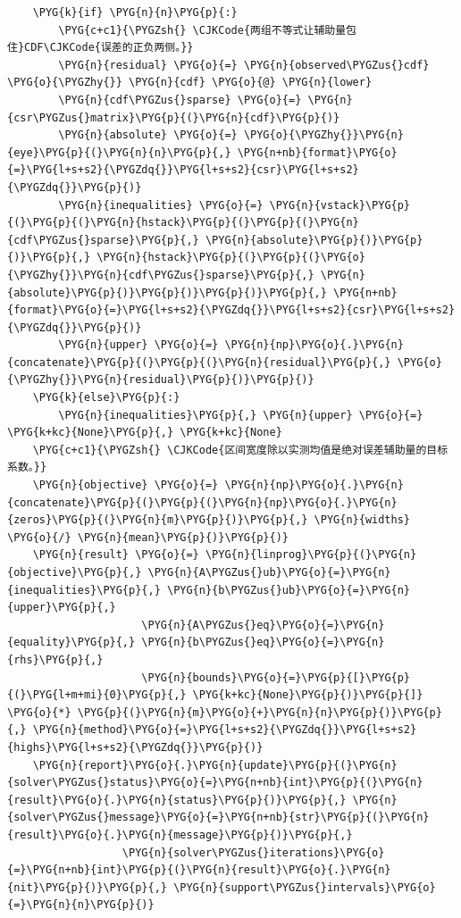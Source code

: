 \begin{Verbatim}
    \PYG{k}{if} \PYG{n}{n}\PYG{p}{:}
        \PYG{c+c1}{\PYGZsh{} \CJKCode{两组不等式让辅助量包住}CDF\CJKCode{误差的正负两侧。}}
        \PYG{n}{residual} \PYG{o}{=} \PYG{n}{observed\PYGZus{}cdf} \PYG{o}{\PYGZhy{}} \PYG{n}{cdf} \PYG{o}{@} \PYG{n}{lower}
        \PYG{n}{cdf\PYGZus{}sparse} \PYG{o}{=} \PYG{n}{csr\PYGZus{}matrix}\PYG{p}{(}\PYG{n}{cdf}\PYG{p}{)}
        \PYG{n}{absolute} \PYG{o}{=} \PYG{o}{\PYGZhy{}}\PYG{n}{eye}\PYG{p}{(}\PYG{n}{n}\PYG{p}{,} \PYG{n+nb}{format}\PYG{o}{=}\PYG{l+s+s2}{\PYGZdq{}}\PYG{l+s+s2}{csr}\PYG{l+s+s2}{\PYGZdq{}}\PYG{p}{)}
        \PYG{n}{inequalities} \PYG{o}{=} \PYG{n}{vstack}\PYG{p}{(}\PYG{p}{(}\PYG{n}{hstack}\PYG{p}{(}\PYG{p}{(}\PYG{n}{cdf\PYGZus{}sparse}\PYG{p}{,} \PYG{n}{absolute}\PYG{p}{)}\PYG{p}{)}\PYG{p}{,} \PYG{n}{hstack}\PYG{p}{(}\PYG{p}{(}\PYG{o}{\PYGZhy{}}\PYG{n}{cdf\PYGZus{}sparse}\PYG{p}{,} \PYG{n}{absolute}\PYG{p}{)}\PYG{p}{)}\PYG{p}{)}\PYG{p}{,} \PYG{n+nb}{format}\PYG{o}{=}\PYG{l+s+s2}{\PYGZdq{}}\PYG{l+s+s2}{csr}\PYG{l+s+s2}{\PYGZdq{}}\PYG{p}{)}
        \PYG{n}{upper} \PYG{o}{=} \PYG{n}{np}\PYG{o}{.}\PYG{n}{concatenate}\PYG{p}{(}\PYG{p}{(}\PYG{n}{residual}\PYG{p}{,} \PYG{o}{\PYGZhy{}}\PYG{n}{residual}\PYG{p}{)}\PYG{p}{)}
    \PYG{k}{else}\PYG{p}{:}
        \PYG{n}{inequalities}\PYG{p}{,} \PYG{n}{upper} \PYG{o}{=} \PYG{k+kc}{None}\PYG{p}{,} \PYG{k+kc}{None}
    \PYG{c+c1}{\PYGZsh{} \CJKCode{区间宽度除以实测均值是绝对误差辅助量的目标系数。}}
    \PYG{n}{objective} \PYG{o}{=} \PYG{n}{np}\PYG{o}{.}\PYG{n}{concatenate}\PYG{p}{(}\PYG{p}{(}\PYG{n}{np}\PYG{o}{.}\PYG{n}{zeros}\PYG{p}{(}\PYG{n}{m}\PYG{p}{)}\PYG{p}{,} \PYG{n}{widths} \PYG{o}{/} \PYG{n}{mean}\PYG{p}{)}\PYG{p}{)}
    \PYG{n}{result} \PYG{o}{=} \PYG{n}{linprog}\PYG{p}{(}\PYG{n}{objective}\PYG{p}{,} \PYG{n}{A\PYGZus{}ub}\PYG{o}{=}\PYG{n}{inequalities}\PYG{p}{,} \PYG{n}{b\PYGZus{}ub}\PYG{o}{=}\PYG{n}{upper}\PYG{p}{,}
                     \PYG{n}{A\PYGZus{}eq}\PYG{o}{=}\PYG{n}{equality}\PYG{p}{,} \PYG{n}{b\PYGZus{}eq}\PYG{o}{=}\PYG{n}{rhs}\PYG{p}{,}
                     \PYG{n}{bounds}\PYG{o}{=}\PYG{p}{[}\PYG{p}{(}\PYG{l+m+mi}{0}\PYG{p}{,} \PYG{k+kc}{None}\PYG{p}{)}\PYG{p}{]} \PYG{o}{*} \PYG{p}{(}\PYG{n}{m}\PYG{o}{+}\PYG{n}{n}\PYG{p}{)}\PYG{p}{,} \PYG{n}{method}\PYG{o}{=}\PYG{l+s+s2}{\PYGZdq{}}\PYG{l+s+s2}{highs}\PYG{l+s+s2}{\PYGZdq{}}\PYG{p}{)}
    \PYG{n}{report}\PYG{o}{.}\PYG{n}{update}\PYG{p}{(}\PYG{n}{solver\PYGZus{}status}\PYG{o}{=}\PYG{n+nb}{int}\PYG{p}{(}\PYG{n}{result}\PYG{o}{.}\PYG{n}{status}\PYG{p}{)}\PYG{p}{,} \PYG{n}{solver\PYGZus{}message}\PYG{o}{=}\PYG{n+nb}{str}\PYG{p}{(}\PYG{n}{result}\PYG{o}{.}\PYG{n}{message}\PYG{p}{)}\PYG{p}{,}
                  \PYG{n}{solver\PYGZus{}iterations}\PYG{o}{=}\PYG{n+nb}{int}\PYG{p}{(}\PYG{n}{result}\PYG{o}{.}\PYG{n}{nit}\PYG{p}{)}\PYG{p}{,} \PYG{n}{support\PYGZus{}intervals}\PYG{o}{=}\PYG{n}{n}\PYG{p}{)}

\end{Verbatim}
